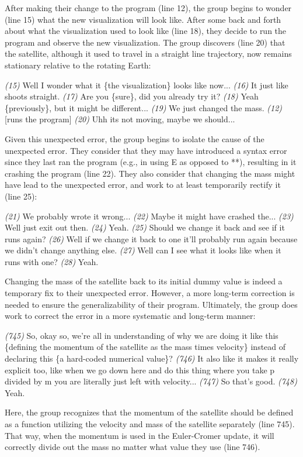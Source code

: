 \documentclass{msuphddissertation}
\begin{document}
\begin{doublespace}
After making their change to the program (line 12), the group begins to wonder (line 15) what the new visualization will look like.  After some back and forth about what the visualization used to look like (line 18), they decide to run the program and observe the new visualization.  The group discovers (line 20) that the satellite, although it used to travel in a straight line trajectory, now remains stationary relative to the rotating Earth:\begin{description}
\SA \textit{(15)} Well I wonder what it \{the visualization\} looks like now...
\SD \textit{(16)} It just like shoots straight.
\SA \textit{(17)} Are you \{sure\}, did you already try it?
\SC \textit{(18)} Yeah \{previously\}, but it might be different...
\SD \textit{(19)} We just changed the mass.
\SC \textit{(12)} [runs the program]
\SA \textit{(20)} Uhh its not moving, maybe we should...\end{description}  Given this unexpected error, the group begins to isolate the cause of the unexpected error.  They consider that they may have introduced a syntax error since they last ran the program (e.g., in using E as opposed to **), resulting in it crashing the program (line 22).  They also consider that changing the mass might have lead to the unexpected error, and work to at least temporarily rectify it (line 25): \begin{description}
\SC \textit{(21)} We probably wrote it wrong...
\SC \textit{(22)} Maybe it might have crashed the...
\SA \textit{(23)} Well just exit out then.
\SD \textit{(24)} Yeah.
\SD \textit{(25)} Should we change it back and see if it runs again?
\SC \textit{(26)} Well if we change it back to one it'll probably run again because we didn't change anything else.
\SA \textit{(27)} Well can I see what it looks like when it runs with one?
\SC \textit{(28)} Yeah.
\end{description}

Changing the mass of the satellite back to its initial dummy value is indeed a temporary fix to their unexpected error.  However, a more long-term correction is needed to ensure the generalizability of their program.  Ultimately, the group does work to correct the error in a more systematic and long-term manner: \begin{description}
\SB \textit{(745)} So, okay so, we're all in understanding of why we are doing it like this \{defining the momentum of the satellite as the mass times velocity\} instead of declaring this \{a hard-coded numerical value\}?
\SB \textit{(746)} It also like it makes it really explicit too, like when we go down here and do this thing where you take p divided by m you are literally just left with velocity...
\SB \textit{(747)} So that's good.
\SD \textit{(748)} Yeah.
\end{description}  Here, the group recognizes that the momentum of the satellite should be defined as a function utilizing the velocity and mass of the satellite separately (line 745).  That way, when the momentum is used in the Euler-Cromer update, it will correctly divide out the mass no matter what value they use (line 746). 


\end{doublespace}
\end{document}
